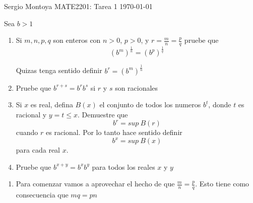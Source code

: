 \documentclass[12pt]{article}
\newenvironment{ex}[2][Ejercicio]{\begin{trivlist}
\item[\hskip \labelsep {\bfseries #1}\hskip \labelsep {\bfseries #2.}]}{\end{trivlist}}
\newenvironment{sol}[1][Solución]{\begin{trivlist}
\item[\hskip \labelsep {\bfseries #1:}]}{\end{trivlist}}
\begin{document}

\noindent Sergio Montoya \hfill {\Large MATE2201: Tarea 1} \hfill \today

\begin{ex}{1.6} 
	Sea $b > 1$
	\begin{enumerate}
		\item Si $m,n,p,q$ son enteros con $n > 0$, $p > 0$, y $r = \frac{m}{n} = \frac{p}{q}$ pruebe que $$(b^m)^{\frac{1}{n}} = (b^p)^{\frac{1}{q}}$$

			Quizas tenga sentido definir $b^r = (b^m)^{\frac{1}{n}}$
		\item Pruebe que $b^{r+s}=b^rb^s$ si $r$ y $s$ son racionales
		\item Si $x$ es real, defina $B(x)$ el conjunto de todos los numeros $b^t$, donde $t$ es racional y $y=t\le x$. Demuestre que $$b^r=sup\ B(r)$$ cuando $r$ es racional. Por lo tanto hace sentido definir $$b^x = sup\ B(x)$$ para cada real $x$.
		\item Pruebe que $b^{x+y} = b^xb^y $ para todos los reales $x$ y $y$
	\end{enumerate}
\end{ex}

\begin{sol}
	\begin{enumerate}
		\item Para comenzar vamos a aprovechar el hecho de que $\frac{m}{n} = \frac{p}{q}$. Esto tiene como consecuencia que $mq = pn$
	\end{enumerate}
\end{sol}

\end{document}
